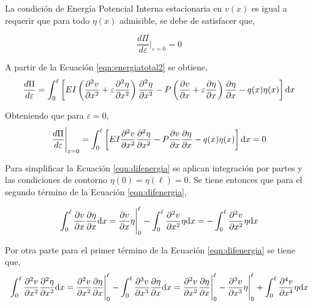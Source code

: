La condición de Energía Potencial Interna estacionaria en $v(x)$ es igual a requerir que para todo $\eta(x)$ admisible, se debe de satisfacer que,

\begin{equation}
\frac{d\Pi}{d\varepsilon} \Bigg|_{\varepsilon=0} = 0
\end{equation}

A partir de la Ecuación \eqref{eqn:energiatotal2} se obtiene,
\begin{equation}
\frac{d\Pi}{d\varepsilon} = \int_0^\ell \left[ EI \left( \frac{\partial^2 v}{\partial x^2} + \varepsilon\frac{\partial^2 \eta}{\partial x^2} \right) \frac{\partial^2 \eta}{\partial x^2} - P \left(\frac{\partial v}{\partial x} + \varepsilon\frac{\partial \eta}{\partial x}\right)\frac{\partial \eta}{\partial x}- q(x) \eta(x) \right] {\text{d}} x
\end{equation}

Obteniendo que para $\varepsilon=0$,
\begin{equation}\label{eqn:difenergia}
\frac{d\Pi}{d\varepsilon} \Bigg|_{\varepsilon=0} = \int_0^\ell \left[ EI \frac{\partial^2 v}{\partial x^2} \frac{\partial^2 \eta}{\partial x^2} - P \frac{\partial v}{\partial x}\frac{\partial \eta}{\partial x}- q(x) \eta(x) \right] {\text{d}} x = 0
\end{equation}

Para simplificar la Ecuación \eqref{eqn:difenergia} se aplican integración por partes y las condiciones de contorno $\eta(0)=\eta(\ell)=0$. Se tiene entonces que para el segundo término de la Ecuación \eqref{eqn:difenergia},

\begin{equation}\label{eqn:partes1}
\int_0^\ell \frac{\partial v}{\partial x} \frac{\partial \eta}{\partial x}{\text{d}} x = \frac{\partial v}{\partial x}\eta\Bigg|_0^\ell - \int_0^\ell \frac{\partial^2 v}{\partial x^2} \eta{\text{d}} x 
= -\int_0^\ell \frac{\partial^2 v}{\partial x^2} \eta{\text{d}} x
\end{equation}

Por otra parte para el primer término de la Ecuación \eqref{eqn:difenergia} se tiene que,
$$
\int_0^\ell \frac{\partial^2 v}{\partial x^2} \frac{\partial^2 \eta}{\partial x^2}{\text{d}} x = \frac{\partial^2 v}{\partial x^2} \frac{\partial \eta}{\partial x}\Bigg|_0^\ell - \int_0^\ell \frac{\partial^3 v}{\partial x^3} \frac{\partial \eta}{\partial x}{\text{d}} x = \frac{\partial^2 v}{\partial x^2} \frac{\partial \eta}{\partial x}\Bigg|_0^\ell - \frac{\partial^3 v}{\partial x^3}\eta\Bigg|_0^\ell + \int_0^\ell \frac{\partial^4 v}{\partial x^4} \eta{\text{d}} x
$$

